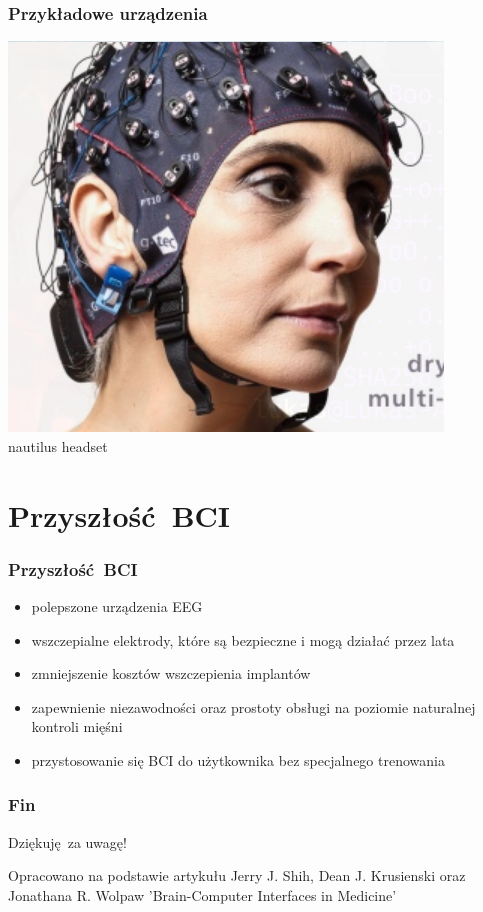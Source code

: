 \documentclass{beamer}
\begin{document}
\begin{frame}
    \frametitle{Przykładowe urządzenia}
    \begin{center}
        \includegraphics[scale=0.5]{nautillus.png}
        \\

        {\tiny nautilus headset }
    \end{center}    
\end{frame}

\section{Przyszłość BCI}

\begin{frame}
    \frametitle{Przyszłość BCI}
    \begin{itemize}
        \item polepszone urządzenia EEG
        \item wszczepialne elektrody, które są bezpieczne i mogą działać przez lata
        \item zmniejszenie kosztów wszczepienia implantów
        \item zapewnienie niezawodności oraz prostoty obsługi na poziomie naturalnej kontroli mięśni
        \item przystosowanie się BCI do użytkownika bez specjalnego trenowania 
    \end{itemize}
\end{frame}

\begin{frame}
    \frametitle{Fin}
    \begin{center}
    Dziękuję za uwagę!
    \end{center}
    \mbox{}
    \vfill
    \begin{center}
        {\tiny Opracowano na podstawie artykułu Jerry J. Shih, Dean J. Krusienski oraz Jonathana R. Wolpaw 'Brain-Computer Interfaces in Medicine'}
    \end{center}
\end{frame}
\end{document}

